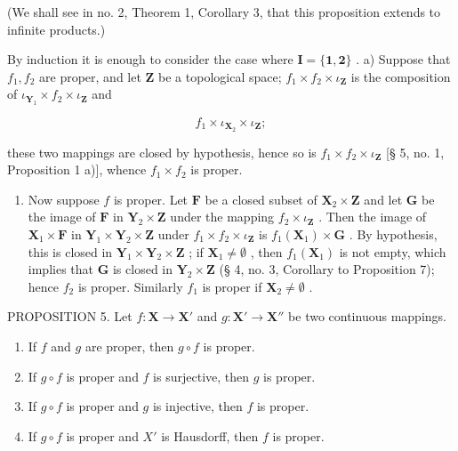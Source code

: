(We shall see in no. 2, Theorem 1, Corollary 3, that this proposition extends to infinite products.)

By induction it is enough to consider the case where \(\mathbf{I} = \{\mathbf{1},\mathbf{2}\}\) . a) Suppose that \(f_{1}, f_{2}\) are proper, and let \(\mathbf{Z}\) be a topological space; \(f_{1} \times f_{2} \times \iota_{\mathbf{Z}}\) is the composition of \(\iota_{\mathbf{Y}_1} \times f_2 \times \iota_{\mathbf{Z}}\) and

\[
f _ {1} \times \iota_ {\mathbf {X} _ {2}} \times \iota_ {\mathbf {Z}};
\]

these two mappings are closed by hypothesis, hence so is \(f_{1} \times f_{2} \times \iota_{\mathbf{Z}}\) {[}§ 5, no. 1, Proposition 1 a){]}, whence \(f_{1} \times f_{2}\) is proper.

\begin{enumerate}
\def\labelenumi{\alph{enumi})}
\setcounter{enumi}{1}
\tightlist
\item
  Now suppose \(f\) is proper. Let \(\mathbf{F}\) be a closed subset of \(\mathbf{X}_2 \times \mathbf{Z}\) and let \(\mathbf{G}\) be the image of \(\mathbf{F}\) in \(\mathbf{Y}_2 \times \mathbf{Z}\) under the mapping \(f_2 \times \iota_{\mathbf{Z}}\) . Then the image of \(\mathbf{X}_1 \times \mathbf{F}\) in \(\mathbf{Y}_1 \times \mathbf{Y}_2 \times \mathbf{Z}\) under \(f_1 \times f_2 \times \iota_{\mathbf{Z}}\) is \(f_1(\mathbf{X}_1) \times \mathbf{G}\) . By hypothesis, this is closed in \(\mathbf{Y}_1 \times \mathbf{Y}_2 \times \mathbf{Z}\) ; if \(\mathbf{X}_1 \neq \emptyset\) , then \(f_1(\mathbf{X}_1)\) is not empty, which implies that \(\mathbf{G}\) is closed in \(\mathbf{Y}_2 \times \mathbf{Z}\) (§ 4, no. 3, Corollary to Proposition 7); hence \(f_2\) is proper. Similarly \(f_1\) is proper if \(\mathbf{X}_2 \neq \emptyset\) .
\end{enumerate}

PROPOSITION 5. Let \(f: \mathbf{X} \to \mathbf{X}'\) and \(g: \mathbf{X}' \to \mathbf{X}''\) be two continuous mappings.

\begin{enumerate}
\def\labelenumi{\alph{enumi})}
\item
  If \(f\) and \(g\) are proper, then \(g \circ f\) is proper.
\item
  If \(g \circ f\) is proper and \(f\) is surjective, then \(g\) is proper.
\item
  If \(g \circ f\) is proper and \(g\) is injective, then \(f\) is proper.
\item
  If \(g \circ f\) is proper and \(X'\) is Hausdorff, then \(f\) is proper.
\end{enumerate}

